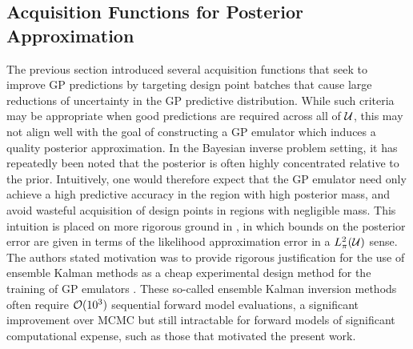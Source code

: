 \documentclass[12pt]{article}
\begin{document}
\subsection{Acquisition Functions for Posterior Approximation}
The previous section introduced several acquisition functions that seek to improve GP predictions by targeting
design point batches that cause large reductions of uncertainty in the GP predictive distribution. While such criteria may be appropriate 
when good predictions are required across all of $\mathcal{U}$, this may not align well with the goal of constructing a GP emulator 
which induces a quality posterior approximation. In the Bayesian inverse problem setting, it has repeatedly been noted that the 
posterior is often highly concentrated relative to the prior. Intuitively, one would therefore expect that the GP emulator need only 
achieve a high predictive accuracy in the region with high posterior mass, and avoid wasteful acquisition of design points in 
regions with negligible mass. This intuition is placed on more rigorous ground in \cite{StuartTeck2}, in which bounds on the 
posterior error are given in terms of the likelihood approximation error in a $L^2_{\pi}(\mathcal{U})$ sense. The authors 
stated motivation was to provide rigorous justification for the use of ensemble Kalman methods as a cheap experimental 
design method for the training of GP emulators \cite{CES, idealizedGCM}. These so-called ensemble Kalman inversion methods 
often require $\mathcal{O}(10^3)$ sequential forward model evaluations, a significant improvement over MCMC but still intractable for 
forward models of significant computational expense, such as those that motivated the present work. 
\end{document}
